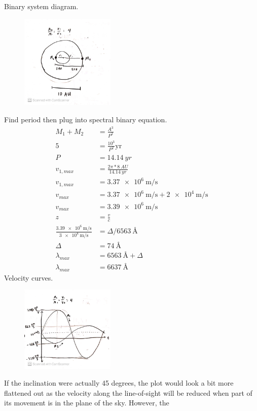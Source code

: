 \documentclass{homework}
\begin{document}
\question
\begin{alphaparts}
    \questionpart Binary system diagram.
    \begin{figure}[h]
        \centering
        \includegraphics[width=0.4\textwidth]{problem3a.jpg}
    \end{figure}
    
    \questionpart Find period then plug into spectral binary equation.
        \begin{align*}
            M_1 + M_2	&=  \frac{A^3}{P^2}	\\
            5	&=  \frac{10^3}{P^2} \text{yr}	\\
            P   &=  \SI{14.14}{yr}   \\
            v_{1,max}   &=  \frac{2\pi*\SI{8}{AU}}{\SI{14.14}{yr}}  \\
            v_{1,max}   &=  \SI{3.37e6}{\metre\per\second}  \\
            v_{max} &=  \SI{3.37e6}{\metre\per\second}  + \SI{2e4}{\metre\per\second}   \\
            v_{max} &=  \SI{3.39e6}{\metre\per\second}  \\
            z   &=  \frac{v}{c} \\
            \frac{\SI{3.39e6}{\metre\per\second}}{\SI{3e8}{\metre\per\second}}    &=  \Delta / \SI{6563}{\angstrom} \\
            \Delta  &=	\SI{74}{\angstrom}	\\
            \lambda_{max}   &=  \SI{6563}{\angstrom} + \Delta  \\
            \lambda_{max}   &=  \boxed{\SI{6637}{\angstrom}}
        \end{align*}
    \questionpart Velocity curves.
    \begin{figure}[h]
        \centering
        \includegraphics[width=0.4\textwidth]{problem3c.jpg}
    \end{figure}
    
    \questionpart If the inclination were actually 45 degrees, the plot would look a bit more flattened out as the velocity along the line-of-sight will be reduced when part of its movement is in the plane of the sky. However, the 
\end{alphaparts}
\end{document}
